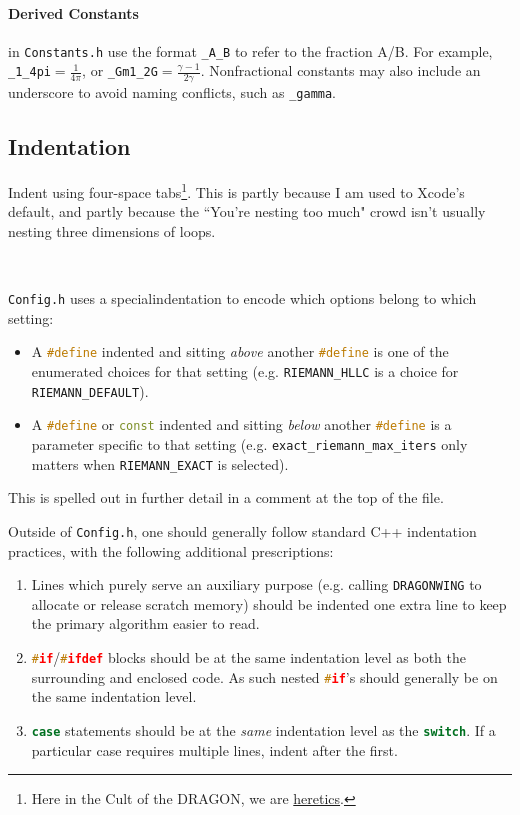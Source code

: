 \documentclass[11pt]{report}
\newcommand{\cpp}[1]{\lstinline[language=C++]{#1}}
\newcommand{\bash}[1]{\lstinline[language=bash]{#1}}
\begin{document}
\paragraph{Derived Constants}in \bash{Constants.h} use the format \cpp{_A_B} to refer to the fraction A/B. For example, \cpp{_1_4pi}$=\frac1{4\pi}$, or \cpp{_Gm1_2G}$= \frac{\gamma-1}{2\gamma}$.  Nonfractional constants may also include an underscore to avoid naming conflicts, such as \cpp{_gamma}. 



\subsection{Indentation}

Indent using four-space tabs\footnote{Here in the Cult of the DRAGON, we are \href{https://github.com/torvalds/linux/blob/master/Documentation/process/coding-style.rst}{heretics}.}. This is partly because I am used to Xcode's default, and partly because the ``You're nesting too much" crowd isn't usually nesting three dimensions of loops. 

\

\noindent \bash{Config.h} uses a specialindentation to encode which options belong to which setting:
\begin{itemize}
\item A \cpp{#define} indented and sitting \textit{above} another \cpp{#define}  is one of the enumerated choices for that setting (e.g. \cpp{RIEMANN_HLLC} is a choice for \cpp{RIEMANN_DEFAULT}).

\item A \cpp{#define} or \cpp{const} indented and sitting \textit{below} another \cpp{#define} is a parameter specific to that setting (e.g. \cpp{exact_riemann_max_iters} only matters when \cpp{RIEMANN_EXACT} is selected).

\end{itemize}
This is spelled out in further detail in a comment at the top of the file.

Outside of \bash{Config.h}, one should generally follow standard C++ indentation practices, with the following additional prescriptions:
\begin{enumerate}
\item Lines which purely serve an auxiliary purpose (e.g. calling \cpp{DRAGONWING} to allocate or release scratch memory) should be indented one extra line to keep the primary algorithm easier to read.
\item \cpp{#if}/\cpp{#ifdef} blocks should be at the same indentation level as both the surrounding and enclosed code. As such nested \cpp{#if}'s should generally be on the same indentation level.%
\item \cpp{case} statements should be at the \textit{same} indentation level as the \cpp{switch}. If a particular case requires multiple lines, indent after the first. 
\end{enumerate}
\end{document}

